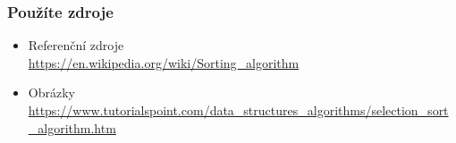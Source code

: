 \documentclass[12pt, hyperref={unicode}]{beamer}
\begin{document}
\begin{frame}
	\frametitle{Použíte zdroje}
	\begin{itemize}
		\item Referenční zdroje \\
			\url {https://en.wikipedia.org/wiki/Sorting_algorithm}		
		\item Obrázky \\
			\url{https://www.tutorialspoint.com/data_structures_algorithms/selection_sort_algorithm.htm}
	\end{itemize}
\end{frame}
\end{document}
